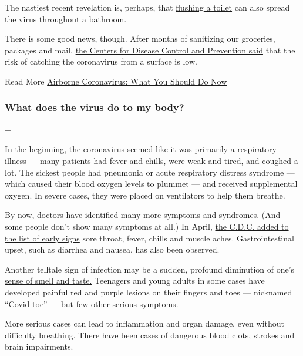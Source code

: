 The nastiest recent revelation is, perhaps, that
\href{https://www.nytimes.com/2020/06/16/health/coronavirus-toilets-flushing.html}{flushing
a toilet} can also spread the virus throughout a bathroom.

There is some good news, though. After months of sanitizing our
groceries, packages and mail,
\href{https://www.nytimes.com/2020/05/22/health/cdc-coronavirus-touching-surfaces.html}{the
Centers for Disease Control and Prevention said} that the risk of
catching the coronavirus from a surface is low.

 Read More
\href{https://www.nytimes.com/2020/07/06/health/coronavirus-airborne-aerosols.html}{Airborne
Coronavirus: What You Should Do Now}

\hypertarget{what-does-the-virus-do-to-my-body}{%
\subsubsection{What does the virus do to my
body?}\label{what-does-the-virus-do-to-my-body}}

+

In the beginning, the coronavirus seemed like it was primarily a
respiratory illness --- many patients had fever and chills, were weak
and tired, and coughed a lot. The sickest people had pneumonia or acute
respiratory distress syndrome --- which caused their blood oxygen levels
to plummet --- and received supplemental oxygen. In severe cases, they
were placed on ventilators to help them breathe.

By now, doctors have identified many more symptoms and syndromes. (And
some people don't show many symptoms at all.) In April,
\href{https://www.nytimes.com/2020/04/27/health/coronavirus-symptoms-cdc.html}{the
C.D.C. added to the list of early signs} sore throat, fever, chills and
muscle aches. Gastrointestinal upset, such as diarrhea and nausea, has
also been observed.

Another telltale sign of infection may be a sudden, profound diminution
of one's
\href{https://www.nytimes.com/2020/03/22/health/coronavirus-symptoms-smell-taste.html}{sense
of smell and taste.} Teenagers and young adults in some cases have
developed painful red and purple lesions on their fingers and toes ---
nicknamed ``Covid toe'' --- but few other serious symptoms.

More serious cases can lead to inflammation and organ damage, even
without difficulty breathing. There have been cases of dangerous blood
clots, strokes and brain impairments.

